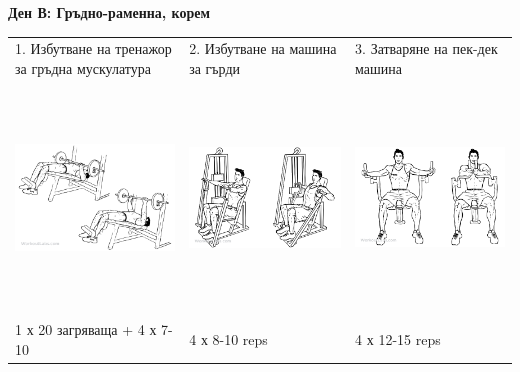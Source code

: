 \documentclass{article}
\begin{document}
\newpage
\textbf{Ден В: Гръдно-раменна, корем}\\
\begin{tabular}{ | m{5cm} | m{5cm} | m{5cm} | }
\hline
1. Избутване на тренажор за гръдна мускулатура & 
2. Избутване на машина за гърди & 
3. Затваряне на пек-дек машина\\ 
\begin{minipage}{5cm} \includegraphics[width=\linewidth, height=60mm]{Decline_Barbell_Bench_Press.png} \end{minipage}&
\begin{minipage}{5cm} \includegraphics[width=\linewidth, height=60mm]{Hammer_Strength_Machine_Chest.png} \end{minipage}& 
\begin{minipage}{5cm} \includegraphics[width=\linewidth, height=60mm]{Butterfly.png} \end{minipage}\\ 
1 х 20 загряваща + 4 х 7-10 &  4 х 8-10 reps & 4 х 12-15 reps \\
\hline
\end{tabular}
\end{document}
